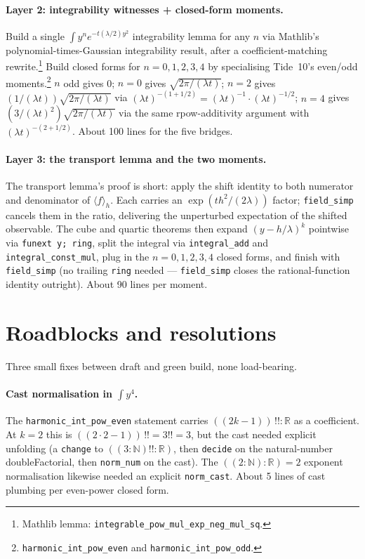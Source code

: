 \documentclass[11pt]{article}
\begin{document}
\paragraph{Layer 2: integrability witnesses + closed-form moments.}
Build a single $\int y^n e^{-t(\lambda/2)y^2}$ integrability lemma
for any $n$ via Mathlib's polynomial-times-Gaussian integrability
result, after a coefficient-matching rewrite.\footnote{Mathlib lemma:
\texttt{integrable\_pow\_mul\_exp\_neg\_mul\_sq}.} Build closed forms
for $n = 0, 1, 2, 3, 4$ by specialising Tide~10's even/odd
moments.\footnote{\texttt{harmonic\_int\_pow\_even} and
\texttt{harmonic\_int\_pow\_odd}.} $n$ odd gives 0; $n = 0$ gives
$\sqrt{2\pi/(\lambda t)}$; $n = 2$ gives $(1/(\lambda t))
\sqrt{2\pi/(\lambda t)}$ via $(\lambda t)^{-(1+1/2)} = (\lambda t)^{-1}
\cdot (\lambda t)^{-1/2}$; $n = 4$ gives $(3/(\lambda t)^2)
\sqrt{2\pi/(\lambda t)}$ via the same rpow-additivity argument with
$(\lambda t)^{-(2+1/2)}$. About 100 lines for the five bridges.

\paragraph{Layer 3: the transport lemma and the two moments.} The
transport lemma's proof is short: apply the shift identity to both
numerator and denominator of $\langle f\rangle_h$. Each carries an
$\exp(t h^2/(2\lambda))$ factor; \texttt{field\_simp} cancels them in
the ratio, delivering the unperturbed expectation of the shifted
observable. The cube and quartic theorems then expand $(y - h/\lambda)^k$
pointwise via \texttt{funext y; ring}, split the integral via
\texttt{integral\_add} and \texttt{integral\_const\_mul}, plug in the
$n = 0, 1, 2, 3, 4$ closed forms, and finish with
\texttt{field\_simp} (no trailing \texttt{ring} needed —
\texttt{field\_simp} closes the rational-function identity outright).
About 90 lines per moment.

\section{Roadblocks and resolutions}

Three small fixes between draft and green build, none load-bearing.

\paragraph{Cast normalisation in $\int y^4$.} The
\texttt{harmonic\_int\_pow\_even} statement carries
$((2k-1)\!\!)\!\!\,!! : \mathbb R$ as a coefficient. At $k = 2$ this
is $((2\cdot 2 - 1)\!\!)\!\!\,!! = 3!! = 3$, but the cast needed
explicit unfolding (a \texttt{change} to $((3 : \mathbb N)!! :
\mathbb R)$, then \texttt{decide} on the natural-number doubleFactorial,
then \texttt{norm\_num} on the cast). The $((2 : \mathbb N) : \mathbb R)
= 2$ exponent normalisation likewise needed an explicit
\texttt{norm\_cast}. About 5 lines of cast plumbing per even-power
closed form.
\end{document}
